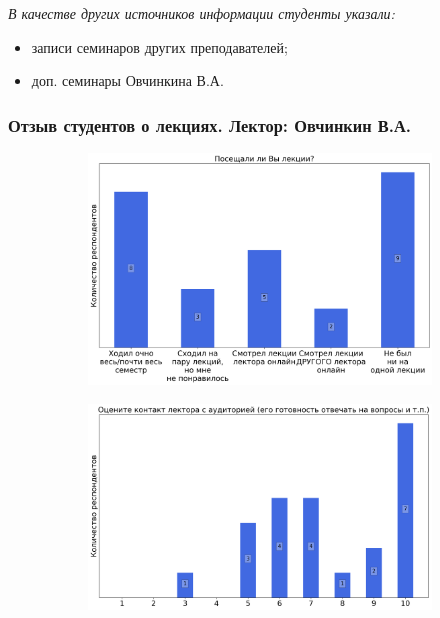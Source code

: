 		\textit{В качестве других источников информации студенты указали:} 
		\begin{itemize}
			\item записи семинаров других преподавателей;
			\item доп. семинары Овчинкина В.А.
		\end{itemize}

	\subsubsection{Отзыв студентов о лекциях. Лектор: Овчинкин В.А.}

		\begin{figure}[H]
			\centering
            \begin{subfigure}[b]{0.45\textwidth}
				\centering
				\includegraphics[width=\textwidth]{images/2 course/Общая физика - электричество и магнетизм/lecturer-questions-Овчинкин В.А.-0.png}
			\end{subfigure}
			\begin{subfigure}[b]{0.45\textwidth}
				\centering
				\includegraphics[width=\textwidth]{images/2 course/Общая физика - электричество и магнетизм/lecturer-marks-Овчинкин В.А.-0.png}

\end{subfigure}
\end{figure}
